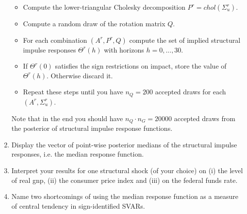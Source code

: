 \documentclass{article}
\begin{document}
\begin{enumerate}
\begin{itemize}
		\item Compute the lower-triangular Cholesky decomposition $P^{r} = chol(\Sigma_u^{r})$.
		\item Compute a random draw of the rotation matrix $Q$.
		\item For each combination $(A^{r},P^{r},Q)$ compute the set of implied structural impulse responses $\Theta^{r}(h)$ with horizons $h=0,...,30$.
		\item If $\Theta^{r}(0)$ satisfies the sign restrictions on impact, store the value of $\Theta^{r}(h)$. Otherwise discard it.
		\item Repeat these steps until you have $n_Q=200$ accepted draws for each $(A^{r},\Sigma_u^{r})$.
		\end{itemize}
		Note that in the end you should have $n_Q\cdot n_{G}=20000$ accepted draws from the posterior of structural impulse response functions.
		\item Display the vector of point-wise posterior medians of the structural impulse responses, i.e. the median response function. 
		\item Interpret your results for one structural shock (of your choice) on (i) the level of real gnp, (ii) the consumer price index and (iii) on the federal funds rate.
		\item Name two shortcomings of using the median response function as a measure of central tendency in sign-identified SVARs.
\end{enumerate} 
\newpage
\end{document}
